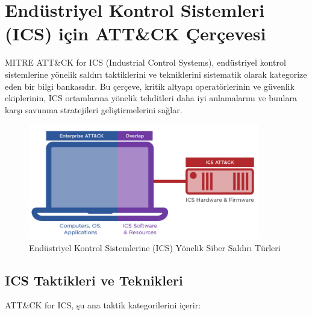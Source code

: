 \section{Endüstriyel Kontrol Sistemleri (ICS) için ATT\&CK Çerçevesi}

MITRE ATT\&CK for ICS (Industrial Control Systems), endüstriyel kontrol sistemlerine yönelik saldırı taktiklerini ve tekniklerini sistematik olarak kategorize eden bir bilgi bankasıdır. Bu çerçeve, kritik altyapı operatörlerinin ve güvenlik ekiplerinin, ICS ortamlarına yönelik tehditleri daha iyi anlamalarını ve bunlara karşı savunma stratejileri geliştirmelerini sağlar.

\begin{figure}[H]
    \centering
    \includegraphics[width=0.9\textwidth]{img/attack-ICS.png}
    \caption{Endüstriyel Kontrol Sistemlerine (ICS) Yönelik Siber Saldırı Türleri}
    \label{fig:attack-ics}
\end{figure}

\subsection{ICS Taktikleri ve Teknikleri}

ATT\&CK for ICS, şu ana taktik kategorilerini içerir:

